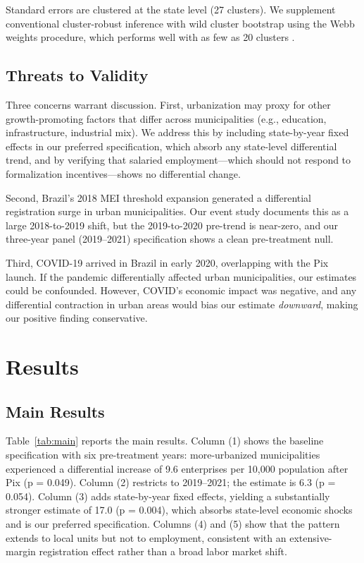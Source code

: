 \documentclass[12pt]{article}
\begin{document}
Standard errors are clustered at the state level (27 clusters). We supplement conventional cluster-robust inference with wild cluster bootstrap \citep{cameron2008bootstrap} using the Webb weights procedure, which performs well with as few as 20 clusters \citep{mackinnon2022wild}.

\subsection{Threats to Validity}

Three concerns warrant discussion. First, urbanization may proxy for other growth-promoting factors that differ across municipalities (e.g., education, infrastructure, industrial mix). We address this by including state-by-year fixed effects in our preferred specification, which absorb any state-level differential trend, and by verifying that salaried employment---which should not respond to formalization incentives---shows no differential change.

Second, Brazil's 2018 MEI threshold expansion generated a differential registration surge in urban municipalities. Our event study documents this as a large 2018-to-2019 shift, but the 2019-to-2020 pre-trend is near-zero, and our three-year panel (2019--2021) specification shows a clean pre-treatment null.

Third, COVID-19 arrived in Brazil in early 2020, overlapping with the Pix launch. If the pandemic differentially affected urban municipalities, our estimates could be confounded. However, COVID's economic impact was negative, and any differential contraction in urban areas would bias our estimate \textit{downward}, making our positive finding conservative.

\section{Results}

\subsection{Main Results}



Table~\ref{tab:main} reports the main results. Column (1) shows the baseline specification with six pre-treatment years: more-urbanized municipalities experienced a differential increase of 9.6 enterprises per 10,000 population after Pix (p = 0.049). Column (2) restricts to 2019--2021; the estimate is 6.3 (p = 0.054). Column (3) adds state-by-year fixed effects, yielding a substantially stronger estimate of 17.0 (p = 0.004), which absorbs state-level economic shocks and is our preferred specification. Columns (4) and (5) show that the pattern extends to local units but not to employment, consistent with an extensive-margin registration effect rather than a broad labor market shift.
\end{document}

